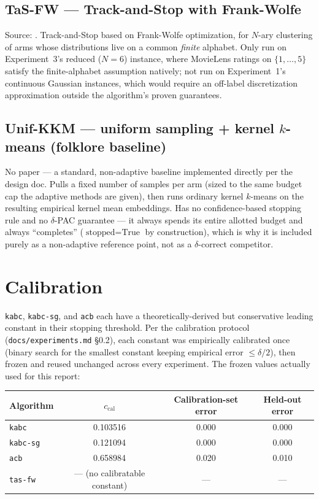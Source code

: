 \documentclass[11pt]{article}
\begin{document}
\subsection{TaS-FW --- Track-and-Stop with Frank-Wolfe}

Source: \cite{tasfw2024}. Track-and-Stop based on Frank-Wolfe optimization, for
$N$-ary clustering of arms whose distributions live on a common \emph{finite}
alphabet. Only run on Experiment~3's reduced ($N=6$) instance, where MovieLens
ratings on $\{1,\ldots,5\}$ satisfy the finite-alphabet assumption natively; not
run on Experiment~1's continuous Gaussian instances, which would require an
off-label discretization approximation outside the algorithm's proven
guarantees.

\subsection{Unif-KKM --- uniform sampling + kernel $k$-means (folklore baseline)}

No paper --- a standard, non-adaptive baseline implemented directly per the
design doc. Pulls a fixed number of samples per arm (sized to the same
budget cap the adaptive methods are given), then runs ordinary kernel
$k$-means on the resulting empirical kernel mean embeddings. Has no
confidence-based stopping rule and no $\delta$-PAC guarantee --- it always
spends its entire allotted budget and always ``completes'' ($\text{stopped}=
\text{True}$ by construction), which is why it is included purely as a
non-adaptive reference point, not as a $\delta$-correct competitor.

\FloatBarrier
\section{Calibration}
\label{sec:calibration}

\texttt{kabc}, \texttt{kabc-sg}, and \texttt{acb} each have a theoretically-derived
but conservative leading constant in their stopping threshold. Per the
calibration protocol (\texttt{docs/experiments.md} \S0.2), each constant was
empirically calibrated once (binary search for the smallest constant keeping
empirical error $\le \delta/2$), then frozen and reused unchanged across every
experiment. The frozen values actually used for this report:

\begin{table}[h]
\centering
\begin{tabular}{lccc}
\toprule
Algorithm & $c_{\text{cal}}$ & Calibration-set error & Held-out error \\
\midrule
\texttt{kabc} & 0.103516 & 0.000 & 0.000 \\
\texttt{kabc-sg} & 0.121094 & 0.000 & 0.000 \\
\texttt{acb} & 0.658984 & 0.020 & 0.010 \\
\texttt{tas-fw} & --- (no calibratable constant) & --- & --- \\
\bottomrule
\end{tabular}
\end{table}
\end{document}
